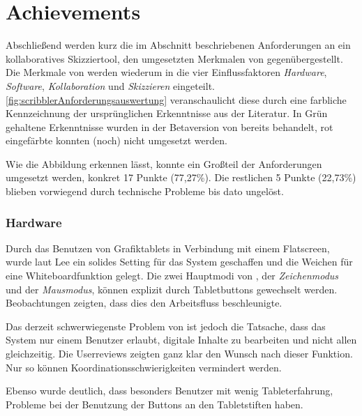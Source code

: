 \section{Achievements} 
Abschließend werden kurz die im Abschnitt  beschriebenen Anforderungen an ein kollaboratives Skizziertool, den umgesetzten Merkmalen von \scribbler gegenübergestellt. Die Merkmale von \scribbler werden wiederum in die vier Einflussfaktoren \emph{Hardware}, \emph{Software}, \emph{Kollaboration} und \emph{Skizzieren} eingeteilt.  \autoref{fig:scribblerAnforderungsauswertung} veranschaulicht diese durch eine farbliche Kennzeichnung der ursprünglichen Erkenntnisse aus der Literatur. In Grün gehaltene Erkenntnisse wurden in der Betaversion von \scribbler bereits behandelt, rot eingefärbte konnten (noch) nicht umgesetzt werden.

\medskip Wie die Abbildung erkennen lässt, konnte ein Großteil der Anforderungen umgesetzt werden, konkret 17 Punkte (77,27\%). Die restlichen 5 Punkte (22,73\%) blieben vorwiegend durch technische Probleme bis dato ungelöst.

\subsubsection*{Hardware} 
Durch das Benutzen von Grafiktablets in Verbindung mit einem Flatscreen, wurde laut Lee ein solides Setting für das System geschaffen und die Weichen für eine Whiteboardfunktion gelegt. Die zwei Hauptmodi von \scribbler, der \emph{Zeichenmodus} und der \emph{Mausmodus}, können explizit durch Tabletbuttons gewechselt werden. Beobachtungen zeigten, dass dies den Arbeitsfluss beschleunigte.

Das derzeit schwerwiegenste Problem von \scribbler ist jedoch die Tatsache, dass das System nur einem Benutzer erlaubt, digitale Inhalte zu bearbeiten und nicht allen gleichzeitig. Die Userreviews zeigten ganz klar den Wunsch nach dieser Funktion. Nur so können Koordinationsschwierigkeiten vermindert werden. 

Ebenso wurde deutlich, dass besonders Benutzer mit wenig Tableterfahrung, Probleme bei der Benutzung der Buttons an den Tabletstiften haben.

